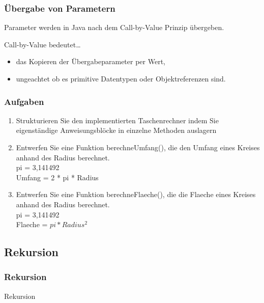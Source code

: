 \begin{frame}[fragile]
	\frametitle{Übergabe von Parametern}
			Parameter werden in Java nach dem Call-by-Value Prinzip übergeben.
			\\
			\begin{block}{Call-by-Value bedeutet\ldots}
				\begin{itemize}
				  \item das Kopieren der Übergabeparameter per Wert, 
				  \item ungeachtet ob es primitive Datentypen oder Objektreferenzen sind.
				\end{itemize}
			\end{block}
\end{frame}

\begin{frame}
	\frametitle{Aufgaben}
	\begin{enumerate}
	  \item Strukturieren Sie den implementierten Taschenrechner indem Sie
	  eigenständige Anweisungsblöcke in einzelne Methoden auslagern
	  \item Entwerfen Sie eine Funktion berechneUmfang(), die den
	  Umfang eines Kreises anhand des Radius berechnet.\\
	  pi = 3,141492 \\
	  Umfang = 2 * pi * Radius
	  \item Entwerfen Sie eine Funktion berechneFlaeche(), die die
	  Flaeche eines Kreises anhand des Radius berechnet.\\
	  pi = 3,141492 \\
	  Flaeche = $pi * Radius^2$
	\end{enumerate}
\end{frame}

\subsection{Rekursion}
\begin{frame}[fragile]
	\frametitle{Rekursion}
	\huge Rekursion
\end{frame}

